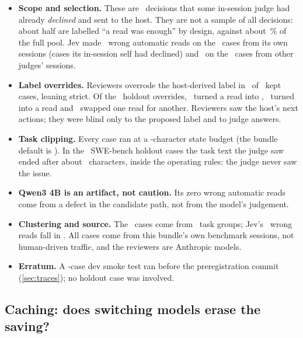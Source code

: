 \begin{caution}[title={Read this before generalizing}]
\begin{itemize}[leftmargin=1.1em]
  \item \textbf{Scope and selection.} These are \TrN\ decisions that some in-session judge had already
    \emph{declined} and sent to the host. They are not a sample of all decisions: about half are labelled
    ``a read was enough'' by design, against about \TrPoolReadPct\,\% of the full pool. Jev made
    \TrJevOwnWa\ wrong automatic reads on the \TrJevOwnN\ cases from its own sessions (cases its
    in-session self had declined) and \TrJevOtherWa\ on the \TrJevOtherN\ cases from other judges'
    sessions.
  \item \textbf{Label overrides.} Reviewers overrode the host-derived label in \TrOverridden\ of
    \TrKept\ kept cases, leaning strict. Of the \TrHoldOverrides\ holdout overrides, \TrOverReadToReason\
    turned a read into , \TrOverReasonToRead\ turned  into a read and
    \TrOverReadToRead\ swapped one read for another. Reviewers saw the host's next actions; they were blind
    only to the proposed label and to judge answers.
  \item \textbf{Task clipping.} Every case ran at a \TrStateBudget-character state budget (the bundle
    default is \TrStateDefault). In the \TrSThree\ SWE-bench holdout cases the task text the judge saw ended
    after about \TrTaskSeen\ characters, inside the operating rules: the judge never saw the issue.
  \item \textbf{Qwen3 4B is an artifact, not caution.} Its zero wrong automatic reads come from a defect
    in the candidate path, not from the model's judgement.
  \item \textbf{Clustering and source.} The \TrN\ cases come from \TrGroups\ task groups; Jev's
    \TrJevWaK\ wrong reads fall in \TrJevWrongGroups. All cases come from this bundle's own benchmark
    sessions, not human-driven traffic, and the reviewers are Anthropic models.
  \item \textbf{Erratum.} A \TrSmokeCases-case dev smoke test ran before the preregistration commit
    (\cref{sec:traces}); no holdout case was involved.
\end{itemize}
\end{caution}

\subsection{Caching: does switching models erase the saving?}\label{sec:caching}

